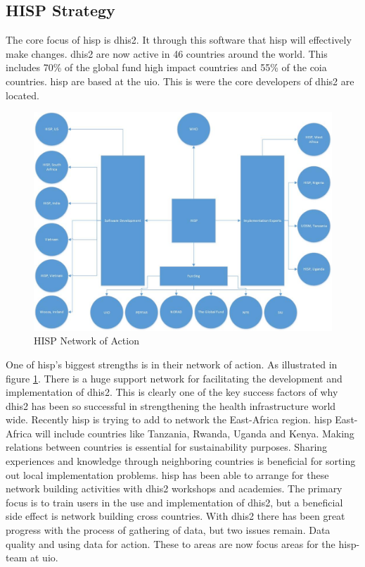 \subsection{HISP Strategy}
The core focus of \gls{hisp} is \gls{dhis2}. 
It through this software that \gls{hisp} will effectively make changes. 
\gls{dhis2} are now active in 46 countries around the world. 
This includes 70\% of the global fund high impact countries and 55\% of the \gls{coia} countries.
\gls{hisp} are based at the \gls{uio}. This is were the core developers of \gls{dhis2} are located. 

\begin{figure}
\centering
\includegraphics[width=\textwidth]{context/img/networkOfAction}
\caption{HISP Network of Action}
\label{fig:hispnet}
\end{figure}

One of \gls{hisp}'s biggest strengths is in their network of action. 
As illustrated in figure \ref{fig:hispnet}. 
There is a huge support network for facilitating the development and implementation of \gls{dhis2}.
This is clearly one of the key success factors of why \gls{dhis2} has been so successful in strengthening the health infrastructure world wide.
Recently \gls{hisp} is trying to add to network the East-Africa region. 
\gls{hisp} East-Africa will include countries like Tanzania, Rwanda, Uganda and Kenya. 
Making relations between countries is essential for sustainability purposes. 
Sharing experiences and knowledge through neighboring countries is beneficial for sorting out local implementation problems. 
\gls{hisp} has been able to arrange for these network building activities with \gls{dhis2} workshops and academies. 
The primary focus is to train users in the use and implementation of \gls{dhis2}, but a beneficial side effect is network building cross countries. 
With \gls{dhis2} there has been great progress with the process of gathering of data, but two issues remain. Data quality and using data for action. 
These to areas are now focus areas for the \gls{hisp}-team at \gls{uio}.

